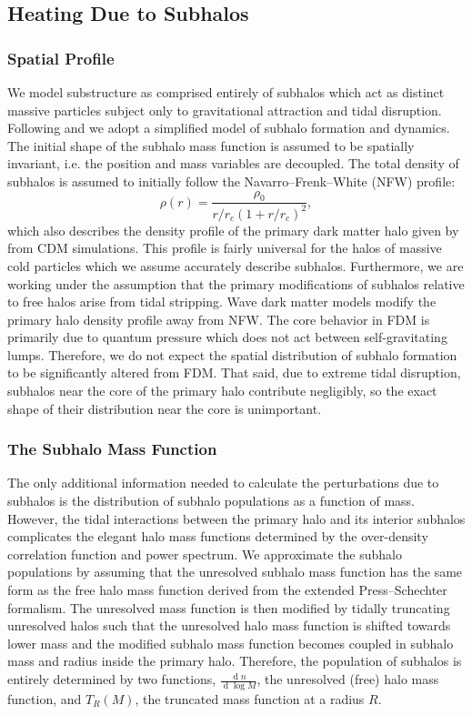 \documentclass[usenatbib]{mnras}
\renewcommand{\d}[1]{\! \mathrm{d}#1 \:}
\renewcommand{\d}[1]{\ensuremath{\operatorname{d}\!{#1}}}
\begin{document}
\subsection{Heating Due to Subhalos}

\subsubsection{Spatial Profile}

We model substructure as comprised entirely of subhalos which act as distinct massive particles subject only to gravitational attraction and tidal disruption. Following \citet{tidal_limit} and \cite{unified_model} we adopt a
simplified model of subhalo
formation and dynamics. The initial shape of
the subhalo mass function is assumed to
be spatially invariant, i.e. the position
and mass variables are decoupled. The
total density of subhalos is assumed to initially
follow the Navarro--Frenk--White (NFW) profile:
\begin{equation}
\rho(r) = \frac{\rho_0}{r/r_c (1+r/r_c)^2},
\end{equation} which also
describes the density profile of the
primary dark matter halo given by \citet{structure} from CDM simulations. This profile is fairly universal for the halos of massive cold particles which we assume accurately describe subhalos. Furthermore, we are working under the assumption that the primary modifications of subhalos relative to free halos arise from tidal stripping. Wave dark matter models modify the primary halo density profile away from NFW. The core behavior in FDM is primarily due to quantum pressure which does not act between self-gravitating lumps. Therefore, we do not expect the spatial distribution of subhalo formation to be significantly altered from FDM. That said, due to extreme tidal disruption, subhalos near the core of the primary halo contribute negligibly, so the exact shape of their distribution near the core is unimportant.  

\subsubsection{The Subhalo Mass Function}

The only additional information needed to calculate the perturbations due to subhalos is the distribution of subhalo populations as a function of mass. However, the tidal interactions between the primary halo and its interior subhalos complicates the elegant halo mass functions determined by the over-density correlation function and power spectrum. We approximate the subhalo populations by assuming that the unresolved subhalo mass function has the same form as the free halo mass function derived from the extended Press--Schechter formalism. The unresolved mass function is then modified by tidally truncating unresolved halos such that the unresolved halo mass function is shifted towards lower mass and the modified subhalo mass function becomes coupled in subhalo mass and radius inside the primary halo. Therefore, the population of subhalos is entirely determined by two functions, $\frac{\d{n}}{\d{\log{M}}}$, the unresolved (free) halo mass function, and $T_R(M)$, the truncated mass function at a radius $R$. 
\end{document}
